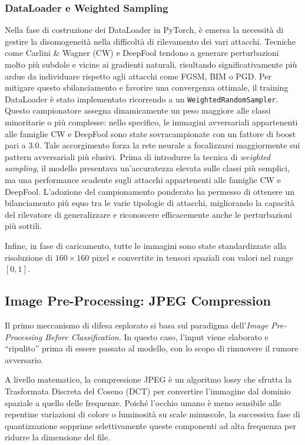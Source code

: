 \documentclass[a4paper, 12pt]{article}
\begin{document}
\subsubsection{DataLoader e Weighted Sampling}Nella fase di costruzione dei DataLoader in PyTorch, è emersa la 
necessità di gestire la disomogeneità nella difficoltà di rilevamento dei vari attacchi. Tecniche come Carlini \& Wagner 
(CW) e DeepFool tendono a generare perturbazioni molto più subdole e vicine ai gradienti naturali, risultando 
significativamente più ardue da individuare rispetto agli attacchi come FGSM, BIM o PGD.
Per mitigare questo sbilanciamento e favorire una convergenza ottimale, il training DataLoader è stato implementato 
ricorrendo a un \texttt{WeightedRandomSampler}. Questo campionatore assegna dinamicamente un peso maggiore alle classi 
minoritarie o più complesse: nello specifico, le immagini avversariali appartenenti alle famiglie CW e DeepFool sono 
state sovracampionate con un fattore di boost pari a 3.0. Tale accorgimento forza la rete neurale a focalizzarsi 
maggiormente sui pattern avversariali più elusivi. Prima di introdurre la tecnica di \textit{weighted sampling}, il 
modello presentava un'accuratezza elevata sulle classi più semplici, ma 
una performance scadente sugli attacchi appartenenti alle famiglie CW e DeepFool. L'adozione del campionamento ponderato ha permesso di
ottenere un bilanciamento più equo tra le varie tipologie di attacchi, migliorando la capacità del rilevatore di
generalizzare e riconoscere efficacemente anche le perturbazioni più sottili.

Infine, in fase di caricamento, tutte le immagini sono state standardizzate alla risoluzione di $160 \times 160$ pixel e 
convertite in tensori spaziali con valori nel range $[0, 1]$.


\vspace{15pt} 



\subsection{Image Pre-Processing: JPEG Compression}

Il primo meccanismo di difesa esplorato si basa sul paradigma 
dell'\textit{Image Pre-Processing Before Classification}. In questo caso, l'input viene 
elaborato e ``ripulito'' prima di essere passato al modello, con lo scopo di rimuovere il 
rumore avversario. 

A livello matematico, la compressione JPEG è un algoritmo lossy che sfrutta la 
Trasformata Discreta del Coseno (DCT) per convertire l'immagine dal dominio spaziale a 
quello delle frequenze. Poiché l'occhio umano è meno sensibile alle repentine variazioni di 
colore o luminosità su scale minuscole, la successiva fase di quantizzazione sopprime 
selettivamente queste componenti ad alta frequenza per ridurre la dimensione del file. 
\end{document}

